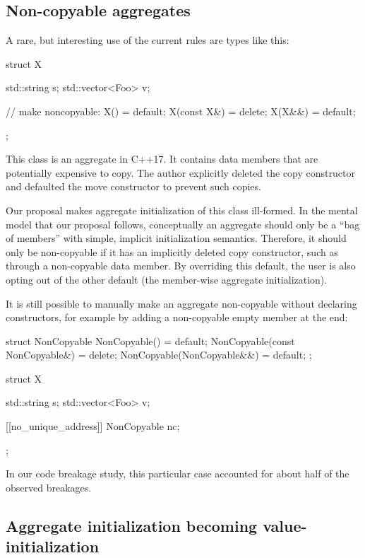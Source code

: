 
\subsection {Non-copyable aggregates}

A rare, but interesting use of the current rules are types like this:

\begin{codeblock}
struct X {
  std::string s;
  std::vector<Foo> v;

  // make noncopyable:
  X() = default;
  X(const X&) = delete;
  X(X&&) = default;
};
\end{codeblock}

This class is an aggregate in C++17. It contains data members that are potentially expensive to copy. The author explicitly deleted the copy constructor and defaulted the move constructor to prevent such copies. 

Our proposal makes aggregate initialization of this class ill-formed. In the mental model that our proposal follows, conceptually an aggregate should only be a ``bag of members'' with simple, implicit initialization semantics. Therefore, it should only be non-copyable if it has an implicitly deleted copy constructor, such as through a non-copyable data member. By overriding this default, the user is also opting out of the other default (the member-wise aggregate initialization).

It is still possible to manually make an aggregate non-copyable without declaring constructors, for example by adding a non-copyable empty member at the end:

\begin{codeblock}
struct NonCopyable {
  NonCopyable() = default;
  NonCopyable(const NonCopyable&) = delete;
  NonCopyable(NonCopyable&&) = default;
};

struct X {
  std::string s;
  std::vector<Foo> v;

  [[no_unique_address]] NonCopyable nc;
};
\end{codeblock}

In our code breakage study, this particular case accounted for about half of the observed breakages.


\subsection{Aggregate initialization becoming value-initialization}

